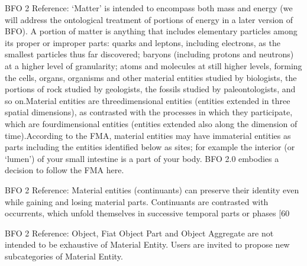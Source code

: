 \documentclass[letterpaper,10pt,english]{sphinxmanual}
\begin{document}
\begin{sphinxShadowBox}

\sphinxAtStartPar
BFO 2 Reference: ‘Matter’ is intended to encompass both mass and energy (we will address the ontological treatment of portions of energy in a later version of BFO). A portion of matter is anything that includes elementary particles among its proper or improper parts: quarks and leptons, including electrons, as the smallest particles thus far discovered; baryons (including protons and neutrons) at a higher level of granularity; atoms and molecules at still higher levels, forming the cells, organs, organisms and other material entities studied by biologists, the portions of rock studied by geologists, the fossils studied by paleontologists, and so on.Material entities are three\sphinxhyphen{}dimensional entities (entities extended in three spatial dimensions), as contrasted with the processes in which they participate, which are four\sphinxhyphen{}dimensional entities (entities extended also along the dimension of time).According to the FMA, material entities may have immaterial entities as parts \textendash{} including the entities identified below as sites; for example the interior (or ‘lumen’) of your small intestine is a part of your body. BFO 2.0 embodies a decision to follow the FMA here.

\sphinxAtStartPar
BFO 2 Reference: Material entities (continuants) can preserve their identity even while gaining and losing material parts. Continuants are contrasted with occurrents, which unfold themselves in successive temporal parts or phases {[}60

\sphinxAtStartPar
BFO 2 Reference: Object, Fiat Object Part and Object Aggregate are not intended to be exhaustive of Material Entity. Users are invited to propose new subcategories of Material Entity.
\end{sphinxShadowBox}

\begin{sphinxShadowBox}

\sphinxAtStartPar
{}
\end{sphinxShadowBox}
\begin{quote}

\ignorespaces \end{quote}
\end{document}
